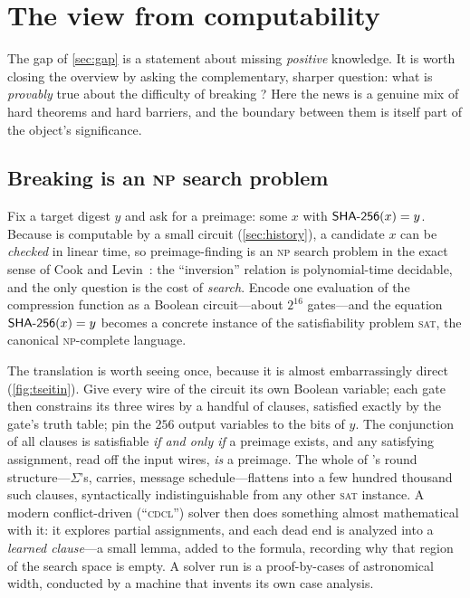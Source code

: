 \section{The view from computability}\label{sec:computability}

The gap of \cref{sec:gap} is a statement about missing \emph{positive}
knowledge. It is worth closing the overview by asking the complementary,
sharper question: what is \emph{provably} true about the difficulty of
breaking \SHA{}? Here the news is a genuine mix of hard theorems and hard
barriers, and the boundary between them is itself part of the object's
significance.

\subsection{Breaking \SHA{} is an \textsc{np} search problem}
\label{sec:npsearch}

Fix a target digest $y$ and ask for a preimage: some $x$ with
$\textsf{SHA-256}(x) = y$. Because \SHA{} is computable by a small circuit
(\cref{sec:history}), a candidate $x$ can be \emph{checked} in linear
time, so preimage-finding is an \textsc{np} search problem in the exact
sense of Cook and Levin~\citep{CookLevin1971}: the ``inversion''
relation is polynomial-time decidable, and the only question is the cost
of \emph{search}. Encode one evaluation of the compression function as a
Boolean circuit---about $2^{16}$ gates---and the equation
$\textsf{SHA-256}(x)=y$ becomes a concrete instance of the satisfiability problem
\textsc{sat}, the canonical \textsc{np}-complete language.

The translation is worth seeing once, because it is almost embarrassingly
direct (\cref{fig:tseitin}). Give every wire of the circuit its own
Boolean variable; each gate then constrains its three wires by a handful
of clauses, satisfied exactly by the gate's truth table; pin the $256$
output variables to the bits of $y$. The conjunction of all clauses is
satisfiable \emph{if and only if} a preimage exists, and any satisfying
assignment, read off the input wires, \emph{is} a preimage. The whole of
\SHA{}'s round structure---$\Sigma$'s, carries, message schedule---flattens
into a few hundred thousand such clauses, syntactically indistinguishable
from any other \textsc{sat} instance. A modern conflict-driven
(``\textsc{cdcl}'') solver then does something almost mathematical with
it: it explores partial assignments, and each dead end is analyzed into
a \emph{learned clause}---a small lemma, added to the formula, recording
why that region of the search space is empty. A solver run is a
proof-by-cases of astronomical width, conducted by a machine that
invents its own case analysis.

